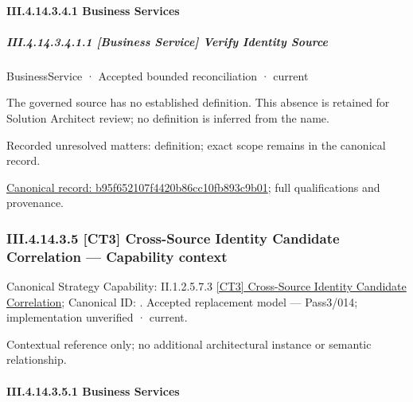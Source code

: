 \paragraph*{III.4.14.3.4.1 Business Services}
\label{navigation:III.4.14.3.4.1}

\subparagraph*{III.4.14.3.4.1.1 [Business Service] Verify Identity Source}
\label{navigation:III.4.14.3.4.1.1}

\label{element:b95f652107f4420b86cc10fb893c9b01}
{\small BusinessService · Accepted bounded reconciliation · current}\par

The governed source has no established definition. This absence is retained for Solution Architect review; no definition is inferred from the name.


{\small Recorded unresolved matters: definition; exact scope remains in the canonical record.}\par
{\footnotesize \href{../../../../../../../continuum/business/business-service/b95f652107f4420b86cc10fb893c9b01.md}{Canonical record: b95f652107f4420b86cc10fb893c9b01}; full qualifications and provenance.}\par
\subsubsection*{III.4.14.3.5 [CT3] Cross-Source Identity Candidate Correlation — Capability context}
\label{navigation:III.4.14.3.5}

{\small Canonical Strategy Capability: II.1.2.5.7.3 \hyperref[element:60d97cd46fde4349864aa737526f08cb]{[CT3] Cross-Source Identity Candidate Correlation}; Canonical ID: \texttt{}. Accepted replacement model — Pass3/014; implementation unverified · current.}\par
Contextual reference only; no additional architectural instance or semantic relationship.\par
\paragraph*{III.4.14.3.5.1 Business Services}
\label{navigation:III.4.14.3.5.1}

